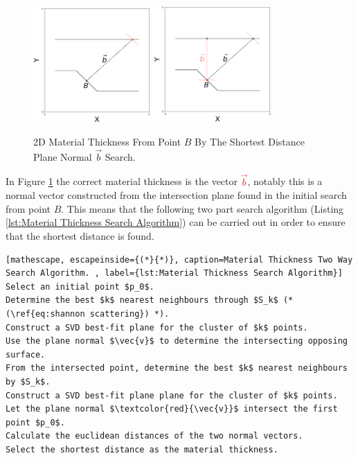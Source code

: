 \documentclass[%
]{USN-MSc}
\begin{document}
\begin{figure}[H]
  \centering
  \includegraphics[width=0.40\textwidth]{fig/2D not parallel 1.png}
  \includegraphics[width=0.40\textwidth]{fig/2D not parallel 2.png}
  \caption{2D Material Thickness From Point \(B\) By The Shortest Distance Plane Normal \(\vec{b}\) Search.}
  \label{fig:2D Material Thickness}
\end{figure}

In Figure \ref{fig:2D Material Thickness} the correct material thickness is the vector \textcolor{red}{\(\vec{b}\)}, notably this is a normal vector constructed from the intersection plane found in the initial search from point \(B\). This means that the following two part search algorithm (Listing \ref{lst:Material Thickness Search Algorithm}) can be carried out in order to ensure that the shortest distance is found. 

\begin{lstlisting}[mathescape, escapeinside={(*}{*)}, caption=Material Thickness Two Way Search Algorithm. , label={lst:Material Thickness Search Algorithm}]
Select an initial point $p_0$.
Determine the best $k$ nearest neighbours through $S_k$ (*(\ref{eq:shannon scattering}) *).
Construct a SVD best-fit plane for the cluster of $k$ points.
Use the plane normal $\vec{v}$ to determine the intersecting opposing surface.
From the intersected point, determine the best $k$ nearest neighbours by $S_k$.
Construct a SVD best-fit plane plane for the cluster of $k$ points.
Let the plane normal $\textcolor{red}{\vec{v}}$ intersect the first point $p_0$.
Calculate the euclidean distances of the two normal vectors.
Select the shortest distance as the material thickness.
\end{lstlisting}
\end{document}
